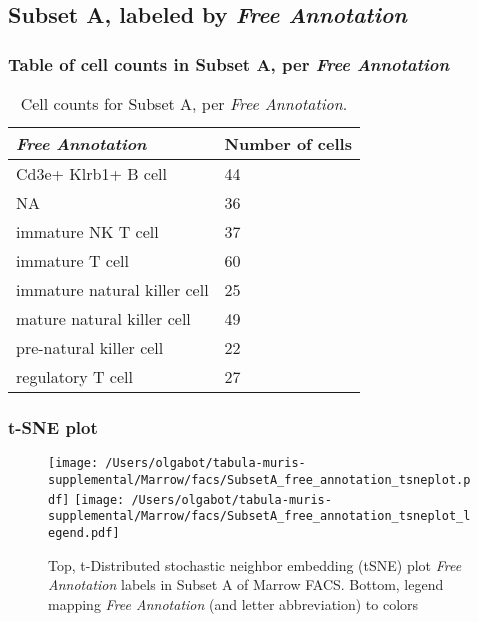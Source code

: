 \clearpage

\subsection{Subset A, labeled by \emph{Free Annotation}}
\subsubsection{Table of cell counts in Subset A, per \emph{Free Annotation}}\begin{table}[h]
\centering
\label{my-label}
\begin{tabular}{@{}ll@{}}
\toprule

\emph{Free Annotation}& Number of cells \\ \midrule
Cd3e+ Klrb1+ B cell & 44 \\

NA & 36 \\

immature NK T cell & 37 \\

immature T cell & 60 \\

immature natural killer cell & 25 \\

mature natural killer cell & 49 \\

pre-natural killer cell & 22 \\

regulatory T cell & 27 \\
\bottomrule
\end{tabular}
\caption{Cell counts for Subset A, per \emph{Free Annotation}.}
\end{table}

\clearpage
\subsubsection{t-SNE plot}
\begin{figure}[h]
\centering
\texttt{[image: /Users/olgabot/tabula-muris-supplemental/Marrow/facs/SubsetA\_free\_annotation\_tsneplot.pdf]}
\texttt{[image: /Users/olgabot/tabula-muris-supplemental/Marrow/facs/SubsetA\_free\_annotation\_tsneplot\_legend.pdf]}
\caption{Top, t-Distributed stochastic neighbor embedding (tSNE) plot  \emph{Free Annotation} labels in Subset A of Marrow FACS. Bottom, legend mapping \emph{Free Annotation} (and letter abbreviation) to colors}
\end{figure}


